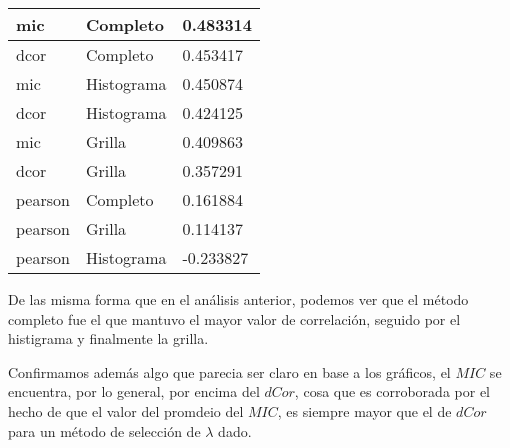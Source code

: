     \begin{table}[H]
        \centering
        \begin{tabular}{|l|l|l|}\hline
        mic     & Completo    & 0.483314  \\\hline
        dcor    & Completo    & 0.453417  \\
        mic     & Histograma  & 0.450874  \\
        dcor    & Histograma  & 0.424125  \\
        mic     & Grilla      & 0.409863  \\
        dcor    & Grilla      & 0.357291  \\
        pearson & Completo    & 0.161884  \\
        pearson & Grilla      & 0.114137  \\
        pearson & Histograma  & -0.233827 \\\hline
        \end{tabular}
    \end{table}
    
    De las misma forma que en el an\'alisis anterior, podemos ver que el m\'etodo completo fue el que mantuvo el mayor valor de correlaci\'on, seguido por el histigrama y finalmente la grilla. 
    
    Confirmamos adem\'as algo que parecia ser claro en base a los gr\'aficos, el $MIC$ se encuentra, por lo general, por encima del $dCor$, cosa que es corroborada por el hecho de que el valor del promdeio del $MIC$, es siempre mayor que el de $dCor$ para un m\'etodo de selecci\'on de $\lambda$ dado.